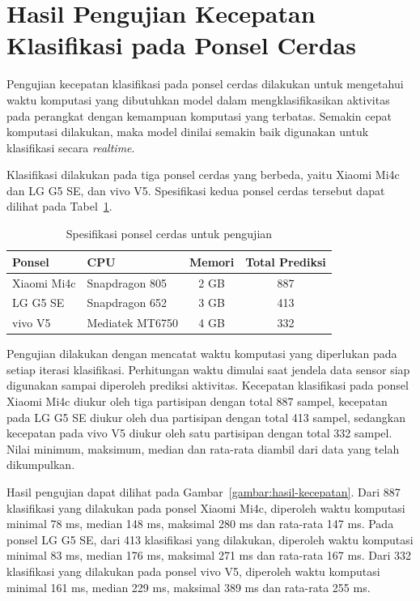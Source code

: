 \section{Hasil Pengujian Kecepatan Klasifikasi pada Ponsel Cerdas}

Pengujian kecepatan klasifikasi pada ponsel cerdas dilakukan untuk mengetahui waktu komputasi yang dibutuhkan model dalam mengklasifikasikan aktivitas pada perangkat dengan kemampuan komputasi yang terbatas. Semakin cepat komputasi dilakukan, maka model dinilai semakin baik digunakan untuk klasifikasi secara \textit{realtime}.

Klasifikasi dilakukan pada tiga ponsel cerdas yang berbeda, yaitu Xiaomi Mi4c dan LG G5 SE, dan vivo V5. Spesifikasi kedua ponsel cerdas tersebut dapat dilihat pada Tabel~\ref{table:spesifikasi-ponsel-cerdas}.

\begin{table}[h!]
    \centering
    \caption{Spesifikasi ponsel cerdas untuk pengujian}
    \begin{tabular}{ |l|l|c|c| }
        \hline
        Ponsel & CPU & Memori & Total Prediksi \\

        \hline
        Xiaomi Mi4c & Snapdragon 805 & 2 GB & 887 \\

        \hline
        LG G5 SE & Snapdragon 652 & 3 GB & 413 \\

        \hline
        vivo V5 & Mediatek MT6750 & 4 GB & 332 \\

        \hline
    \end{tabular}
    \label{table:spesifikasi-ponsel-cerdas}
\end{table}

Pengujian dilakukan dengan mencatat waktu komputasi yang diperlukan pada setiap iterasi klasifikasi. Perhitungan waktu dimulai saat jendela data sensor siap digunakan sampai diperoleh prediksi aktivitas. Kecepatan klasifikasi pada ponsel Xiaomi Mi4c diukur oleh tiga partisipan dengan total 887 sampel, kecepatan pada LG G5 SE diukur oleh dua partisipan dengan total 413 sampel, sedangkan kecepatan pada vivo V5 diukur oleh satu partisipan dengan total 332 sampel. Nilai minimum, maksimum, median dan rata-rata diambil dari data yang telah dikumpulkan.

Hasil pengujian dapat dilihat pada Gambar~\ref{gambar:hasil-kecepatan}. Dari 887 klasifikasi yang dilakukan pada ponsel Xiaomi Mi4c, diperoleh waktu komputasi minimal 78 ms, median 148 ms, maksimal 280 ms dan rata-rata 147 ms. Pada ponsel LG G5 SE, dari 413 klasifikasi yang dilakukan, diperoleh waktu komputasi minimal 83 ms, median 176 ms, maksimal 271 ms dan rata-rata 167 ms. Dari 332 klasifikasi yang dilakukan pada ponsel vivo V5, diperoleh waktu komputasi minimal 161 ms, median 229 ms, maksimal 389 ms dan rata-rata 255 ms.

